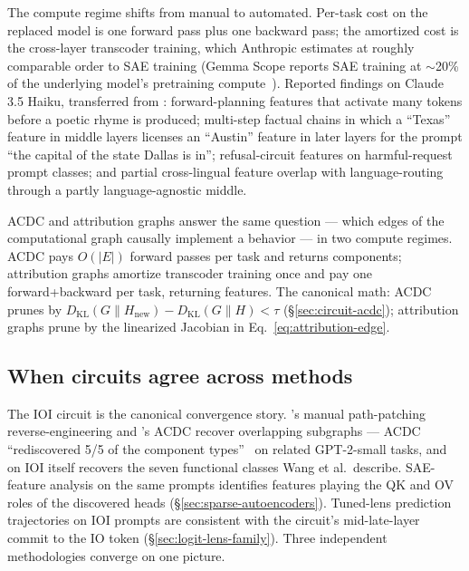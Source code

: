 The compute regime shifts from manual to automated. Per-task cost on
the replaced model is one forward pass plus one backward pass; the
amortized cost is the cross-layer transcoder training, which Anthropic
estimates at roughly comparable order to SAE training (Gemma Scope
reports SAE training at $\sim$20\% of the underlying model's
pretraining compute~\citep{gemma-scope-2024}). Reported findings on
Claude 3.5 Haiku, transferred from
\citet{lindsey2025-biology}: forward-planning
features that activate many tokens before a poetic rhyme is produced;
multi-step factual chains in which a ``Texas'' feature in middle layers
licenses an ``Austin'' feature in later layers for the prompt ``the
capital of the state Dallas is in''; refusal-circuit features on
harmful-request prompt classes; and partial cross-lingual feature
overlap with language-routing through a partly language-agnostic middle.

\begin{intuition}
ACDC and attribution graphs answer the same question --- which edges of
the computational graph causally implement a behavior --- in two
compute regimes. ACDC pays $O(|E|)$ forward passes per task and
returns components; attribution graphs amortize transcoder training
once and pay one forward+backward per task, returning features. The
canonical math: ACDC prunes by
$D_{\mathrm{KL}}(G \| H_{\text{new}}) - D_{\mathrm{KL}}(G \| H) < \tau$
(\S\ref{sec:circuit-acdc}); attribution graphs prune by the linearized
Jacobian in Eq.~\eqref{eq:attribution-edge}.
\end{intuition}

\subsection{When circuits agree across methods}
\label{sec:circuit-agreement}

The IOI circuit is the canonical convergence story.
\citet{wang2022-ioi}'s manual path-patching reverse-engineering and
\citet{conmy2023-acdc}'s ACDC recover overlapping subgraphs --- ACDC
``rediscovered 5/5 of the component types''~\citep[Abstract]{conmy2023-acdc}
on related GPT-2-small tasks, and on IOI itself recovers the seven
functional classes Wang et al.\ describe. SAE-feature analysis on the
same prompts identifies features playing the QK and OV roles of the
discovered heads (\S\ref{sec:sparse-autoencoders}). Tuned-lens
prediction trajectories on IOI prompts are consistent with the
circuit's mid-late-layer commit to the IO token
(\S\ref{sec:logit-lens-family}). Three independent methodologies
converge on one picture.

